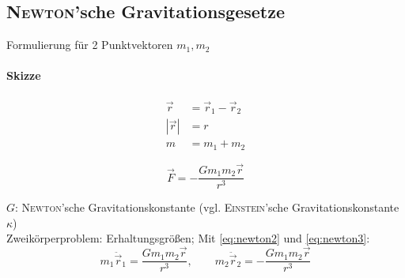 \subsection{\textsc{Newton}'sche Gravitationsgesetze}
\noindent Formulierung für 2 Punktvektoren $m_1, m_2$
\paragraph{Skizze}
\begin{center}
        \begin{minipage}[b]{0.3\textwidth}
            \begin{align*}
                \vec r &= \vec r_1 - \vec r_2 \\
                |\vec r| &= r\\
                m &= m_1 + m_2
            \end{align*}
        \end{minipage}
\end{center}

\begin{equation}
    \boxed{\vec F = -\frac{G m_1 m_2 \vec r}{r^3}}
\end{equation}

\noindent $G$: \textsc{Newton}'sche Gravitationskonstante (vgl. \textsc{Einstein}'sche Gravitationskonstante $\kappa$)\\[0.5em]
\noindent Zweikörperproblem: Erhaltungsgrößen; Mit \autoref{eq:newton2} und \autoref{eq:newton3}:
\begin{equation}
    \boxed{m_1 \ddot \vec{r}_1 = \frac{G m_1 m_2 \vec r}{r^3},\qquad m_2 \ddot \vec{r}_2 = -\frac{G m_1 m_2 \vec r}{r^3}}
    \label{eq:newton_two_body}
\end{equation}

